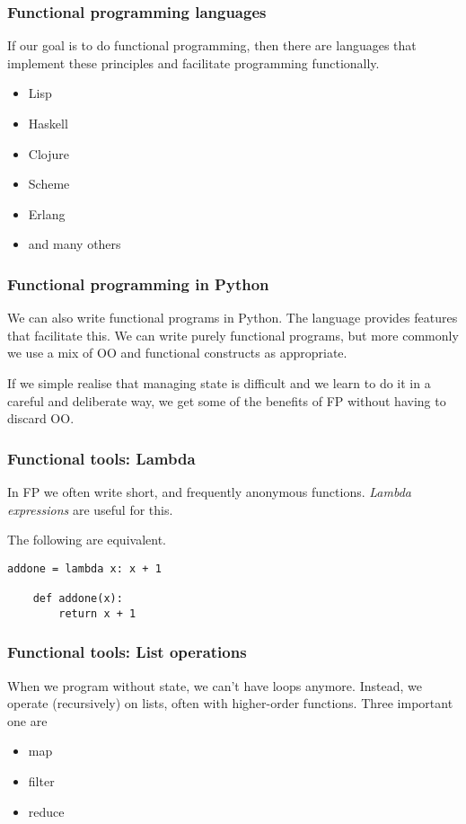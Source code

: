 \documentclass[10pt]{beamer}
\begin{document}
\begin{frame}
  \frametitle{Functional programming languages}

If our goal is to do functional programming, then there are languages 
that implement these principles and facilitate programming functionally.
\begin{itemize}
	\item Lisp
	\item Haskell
	\item Clojure
	\item Scheme
	\item Erlang
	\item and many others
\end{itemize}
\end{frame}
\begin{frame}
  \frametitle{Functional programming in Python}

  We can also write functional programs in Python.  The language
  provides features that facilitate this.  We can write purely functional
  programs, but more commonly we use a mix of OO and functional constructs
  as appropriate.
  \vspace{5mm}

  If we simple realise that managing state is difficult and we learn to do it 
  in a careful and deliberate way, we get some of the benefits of FP without
  having to discard OO.
  \end{frame}

\begin{frame}[fragile]
  \frametitle{Functional tools: Lambda}

  In FP we often write short, and frequently anonymous functions. 
  \emph{Lambda expressions} are useful for this.

  The following are equivalent.
 
\begin{Verbatim}[commandchars=\\\[\]]
    addone = lambda x: x + 1

    def addone(x):
        return x + 1

\end{Verbatim}

\end{frame}

\begin{frame}
  \frametitle{Functional tools: List operations}

  When we program without state, we can't have loops anymore.  Instead,
  we operate (recursively) on lists, often with higher-order functions.
  Three important one are

  \begin{itemize}
	  \item map
	  \item filter
	  \item reduce
  \end{itemize}
  \end{frame}
\end{document}

